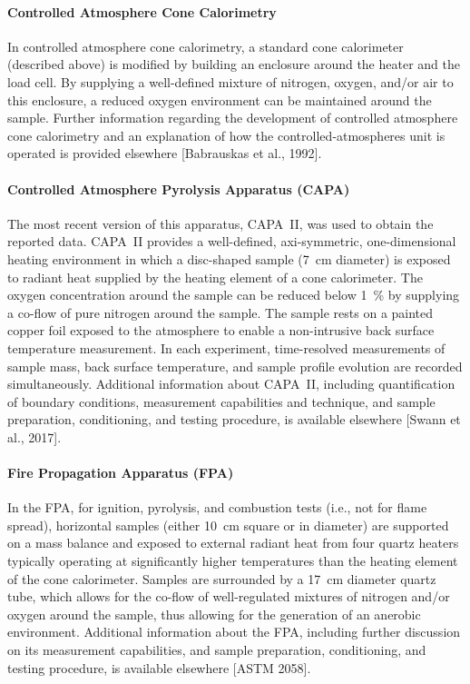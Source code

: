 \documentclass{book}
\begin{document}
\paragraph{Controlled Atmosphere Cone Calorimetry}

In controlled atmosphere cone calorimetry, a standard cone calorimeter (described above) is modified by building an enclosure around the heater and the load cell. By supplying a well-defined mixture of nitrogen, oxygen, and/or air to this enclosure, a reduced oxygen environment can be maintained around the sample. Further information regarding the development of controlled atmosphere cone calorimetry and an explanation of how the controlled‐atmospheres unit is operated is provided elsewhere [Babrauskas et al., 1992].

\paragraph{Controlled Atmosphere Pyrolysis Apparatus (CAPA)}

The most recent version of this apparatus, CAPA~II, was used to obtain the reported data. CAPA~II provides a well-defined, axi-symmetric, one-dimensional heating environment in which a disc-shaped sample (7~cm diameter) is exposed to radiant heat supplied by the heating element of a cone calorimeter. The oxygen concentration around the sample can be reduced below 1~\% by supplying a co-flow of pure nitrogen around the sample. The sample rests on a painted copper foil exposed to the atmosphere to enable a non-intrusive back surface temperature measurement. In each experiment, time-resolved measurements of sample mass, back surface temperature, and sample profile evolution are recorded simultaneously. Additional information about CAPA~II, including quantification of boundary conditions, measurement capabilities and technique, and sample preparation, conditioning, and testing procedure, is available elsewhere [Swann et al., 2017].

\paragraph{Fire Propagation Apparatus (FPA)}

In the FPA, for ignition, pyrolysis, and combustion tests (i.e., not for flame spread), horizontal samples (either 10~cm square or in diameter) are supported on a mass balance and exposed to external radiant heat from four quartz heaters typically operating at significantly higher temperatures than the heating element of the cone calorimeter. Samples are surrounded by a 17~cm diameter quartz tube, which allows for the co-flow of well-regulated mixtures of nitrogen and/or oxygen around the sample, thus allowing for the generation of an anerobic environment. Additional information about the FPA, including further discussion on its measurement capabilities, and sample preparation, conditioning, and testing procedure, is available elsewhere [ASTM 2058].
\end{document}

